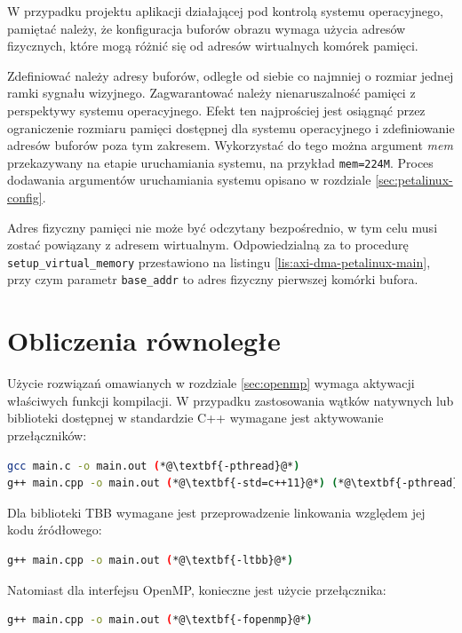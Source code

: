 W przypadku projektu aplikacji działającej pod kontrolą systemu operacyjnego, pamiętać należy, że konfiguracja buforów obrazu wymaga użycia adresów fizycznych, które mogą różnić się od adresów wirtualnych komórek pamięci.

Zdefiniować należy adresy buforów, odległe od siebie co najmniej o rozmiar jednej ramki sygnału wizyjnego. 
Zagwarantować należy nienaruszalność pamięci z perspektywy systemu operacyjnego. 
Efekt ten najprościej jest osiągnąć przez ograniczenie rozmiaru pamięci dostępnej dla systemu operacyjnego i zdefiniowanie adresów buforów poza tym zakresem. 
Wykorzystać do tego można argument \textit{mem} przekazywany na etapie uruchamiania systemu, na przykład \texttt{mem=224M}. 
Proces dodawania argumentów uruchamiania systemu opisano w rozdziale \ref{sec:petalinux-config}. %

Adres fizyczny pamięci nie może być odczytany bezpośrednio, w tym celu musi zostać powiązany z adresem wirtualnym. 
Odpowiedzialną za to procedurę \texttt{setup\_virtual\_memory} przestawiono na listingu \ref{lis:axi-dma-petalinux-main}, przy czym parametr \texttt{base\_addr} to adres fizyczny pierwszej komórki bufora. 

\section{Obliczenia równoległe}
\label{sec:multithreading-config}
Użycie rozwiązań omawianych w rozdziale \ref{sec:openmp} wymaga aktywacji właściwych funkcji kompilacji.
W przypadku zastosowania wątków natywnych lub biblioteki dostępnej w standardzie C++ wymagane jest aktywowanie przełączników: %

\begin{lstlisting}[language=bash]
gcc main.c -o main.out (*@\textbf{-pthread}@*)
g++ main.cpp -o main.out (*@\textbf{-std=c++11}@*) (*@\textbf{-pthread}@*)
\end{lstlisting}

Dla biblioteki TBB wymagane jest przeprowadzenie linkowania względem jej kodu źródłowego:

\begin{lstlisting}[language=bash]
g++ main.cpp -o main.out (*@\textbf{-ltbb}@*)
\end{lstlisting}

Natomiast dla interfejsu OpenMP, konieczne jest użycie przełącznika:

\begin{lstlisting}[language=bash]
g++ main.cpp -o main.out (*@\textbf{-fopenmp}@*)
\end{lstlisting}

